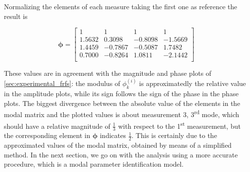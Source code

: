 \documentclass[a4paper,12pt,oneside]{article}
\begin{document}
Normalizing the elements of each measure taking the first one as reference the result is

\[
	\bm{\phi} =	\begin{bmatrix}
								1				& 1				& 1				& 1 \\
								1.5632	& 0.3098	& -0.8098	& -1.5669 \\
								1.4459	& -0.7867 & -0.5087	& 1.7482 \\
								0.7000	& -0.8264 & 1.0811	& -2.1442 \\
							\end{bmatrix}
\]

\vspace{10pt}

These values are in agreement with the magnitude and phase plots of \ref{sec:experimental_frfs}: the modulus of $ \phi^{(i)}_k $ is approximatedly the relative value in the amplitude plots, while its sign follows the sign of the phase in the phase plots. The biggest divergence between the absolute value of the elements in the modal matrix and the plotted values is about measurement 3, 3\textsuperscript{rd} mode, which should have a relative magnitude of $ \frac{1}{3} $ with respect to the 1\textsuperscript{st} measurement, but the corresponding element in $ \bm{\phi} $ indicates $ \frac{1}{2} $. This is certainly due to the approximated values of the modal matrix, obtained by means of a simplified method. In the next section, we go on with the analysis using a more accurate procedure, which is a modal parameter identification model.
\end{document}
